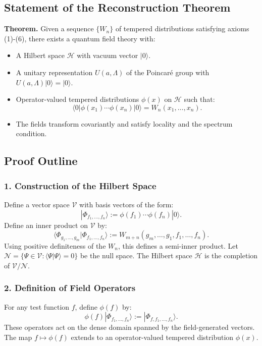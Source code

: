 \documentclass{article}
\begin{document}
\subsection{Statement of the Reconstruction Theorem}

\textbf{Theorem.} Given a sequence $\{ W_n \}$ of tempered distributions satisfying axioms (1)-(6), there exists a quantum field theory with:

\begin{itemize}
  \item A Hilbert space $\mathcal{H}$ with vacuum vector $|0\rangle$.
  \item A unitary representation $U(a, \Lambda)$ of the Poincaré group with $U(a, \Lambda)|0\rangle = |0\rangle$.
  \item Operator-valued tempered distributions $\phi(x)$ on $\mathcal{H}$ such that:
  \[
  \langle 0 | \phi(x_1) \cdots \phi(x_n) | 0 \rangle = W_n(x_1, \dots, x_n).
  \]
  \item The fields transform covariantly and satisfy locality and the spectrum condition.
\end{itemize}

\subsection{Proof Outline}

\subsubsection{1. Construction of the Hilbert Space}

Define a vector space $\mathscr{V}$ with basis vectors of the form:
\[
|\Phi_{f_1, \dots, f_n} \rangle := \phi(f_1) \cdots \phi(f_n) |0\rangle.
\]
Define an inner product on $\mathscr{V}$ by:
\[
\langle \Phi_{g_1, \dots, g_m} | \Phi_{f_1, \dots, f_n} \rangle := W_{m+n}(g_m, \dots, g_1, f_1, \dots, f_n).
\]
Using positive definiteness of the $W_n$, this defines a semi-inner product. Let $\mathscr{N} = \{ \Psi \in \mathscr{V} : \langle \Psi | \Psi \rangle = 0 \}$ be the null space. The Hilbert space $\mathcal{H}$ is the completion of $\mathscr{V}/\mathscr{N}$.

\subsubsection{2. Definition of Field Operators}

For any test function $f$, define $\phi(f)$ by:
\[
\phi(f) |\Phi_{f_1, \dots, f_n}\rangle := |\Phi_{f, f_1, \dots, f_n}\rangle.
\]
These operators act on the dense domain spanned by the field-generated vectors. The map $f \mapsto \phi(f)$ extends to an operator-valued tempered distribution $\phi(x)$.
\end{document}
